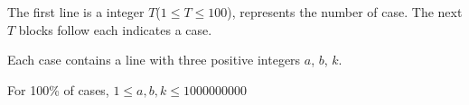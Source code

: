 The first line is a integer $T$($1 \leq T \leq 100$), represents the number of case. The next $T$ blocks follow each indicates a case.

Each case contains a line with three positive integers $a$, $b$, $k$.

For 100\% of cases, $1 \leq a,b,k \leq 1000000000$
